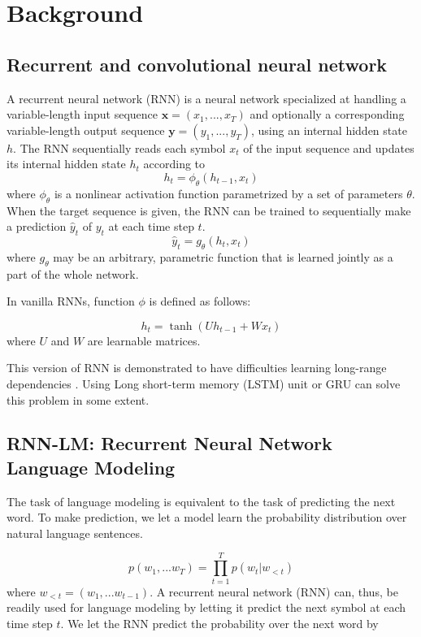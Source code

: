 \section{Background}
\subsection{Recurrent and convolutional neural network}
A recurrent neural network (RNN) is a neural network specialized at handling a variable-length input sequence $\mathbf{x}=(x_1,...,x_T)$ and optionally a corresponding variable-length output sequence $\mathbf{y}=(y_1,...,y_T)$, using an internal hidden state $h$. The RNN sequentially reads each symbol $x_t$ of the input sequence and updates its internal hidden state $h_t$ according to
\begin{equation}
h_t=\phi_\theta(h_{t-1},x_t)
\end{equation}
where $\phi_\theta$ is a nonlinear activation function parametrized by a set of parameters $\theta$. When the target sequence is given, the RNN can be trained to sequentially make a prediction $\hat{y}_t$ of $y_t$ at each time step $t$.
\begin{equation}
\hat{y}_t=g_\theta(h_{t},x_t)
\end{equation}
where $g_\theta$ may be an arbitrary, parametric function that is learned jointly as a part of the whole network.

In vanilla RNNs, function $\phi$ is defined as follows:

\begin{equation}
h_t=\tanh(Uh_{t-1}+Wx_t)
\end{equation}
where $U$ and $W$ are learnable matrices.

This version of RNN is demonstrated to have difficulties learning long-range dependencies \cite{hochreiter1991untersuchungen,pascanu2013difficulty}. Using Long short-term memory (LSTM) unit \cite{hochreiter1997long} or GRU \cite{chung2014empirical,cho2014learning} can solve this problem in some extent.

\subsection{RNN-LM: Recurrent Neural Network Language Modeling}
The task of language modeling is equivalent to the task of predicting the next word. To make prediction, we let a model learn the probability distribution over natural language sentences.

\begin{equation}
p(w_1,...w_T)=\prod_{t=1}^{T}p(w_t|w_{<t})
\end{equation}
where $w_{<t}=(w_1,...w_{t-1})$. A recurrent neural network (RNN) can, thus, be readily used for language modeling by letting it predict the next symbol at each time step $t$. We let the RNN
predict the probability over the next word by

